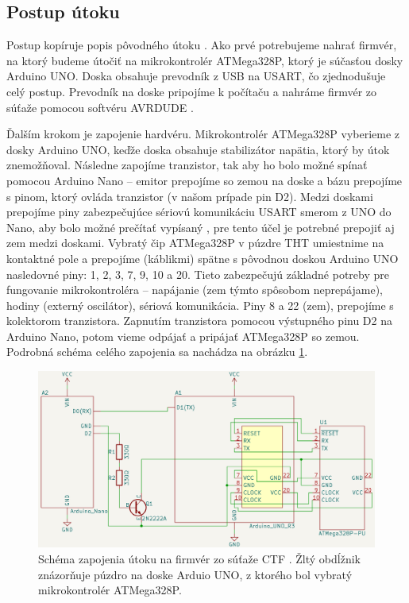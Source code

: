 \subsection{Postup útoku}
Postup kopíruje popis pôvodného útoku \cite{vccOnTheCheap}. Ako prvé potrebujeme nahrať firmvér, na ktorý budeme útočiť na mikrokontrolér ATMega328P, ktorý je súčasťou dosky Arduino UNO. Doska obsahuje prevodník z USB na USART, čo zjednodušuje celý postup. Prevodník na doske pripojíme k počítaču a nahráme firmvér zo súťaže pomocou softvéru AVRDUDE \cite{vccOnTheCheap}.

Ďalším krokom je zapojenie hardvéru. Mikrokontrolér ATMega328P vyberieme z dosky Arduino UNO, keďže doska obsahuje stabilizátor napätia, ktorý by útok znemožňoval. Následne zapojíme tranzistor, tak aby ho bolo možné spínať pomocou Arduino Nano -- emitor prepojíme so zemou na doske a bázu prepojíme s pinom, ktorý ovláda tranzistor (v našom prípade pin D2). Medzi doskami prepojíme piny zabezpečujúce sériovú komunikáciu USART smerom z UNO do Nano, aby bolo možné prečítať vypísaný , pre tento účel je potrebné prepojiť aj zem medzi doskami. Vybratý čip ATMega328P v púzdre THT umiestnime na kontaktné pole a prepojíme (káblikmi) spätne s pôvodnou doskou Arduino UNO nasledovné piny: 1, 2, 3, 7, 9, 10 a 20. Tieto zabezpečujú základné potreby pre fungovanie mikrokontroléra -- napájanie (zem týmto spôsobom neprepájame), hodiny (externý oscilátor), sériová komunikácia. Piny 8 a 22 (zem), prepojíme s kolektorom tranzistora. Zapnutím tranzistora pomocou výstupného pinu D2 na Arduino Nano, potom vieme odpájať a pripájať ATMega328P so zemou. Podrobná schéma celého zapojenia sa nachádza na obrázku \ref{obr:schemeCTF}.

\begin{figure}
    \centerline{\includegraphics[width=1\textwidth]{images/schemeCTF.png}}
    \caption[Schéma zapojenia útoku na firmvér zo súťaže CTF]{Schéma zapojenia útoku na firmvér zo súťaže CTF \cite{vccOnTheCheap}. Žltý obdĺžnik znázorňuje púzdro na doske Arduio UNO, z ktorého bol vybratý mikrokontrolér ATMega328P.}
    \label{obr:schemeCTF}
\end{figure}

